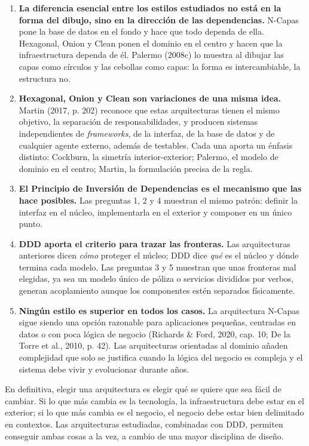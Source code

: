\documentclass[11pt,a4paper]{article}
\begin{document}
\begin{enumerate}[leftmargin=1.5em]
  \item \textbf{La diferencia esencial entre los estilos estudiados no está en la forma del dibujo, sino en la dirección de las dependencias.} N-Capas pone la base de datos en el fondo y hace que todo dependa de ella. Hexagonal, Onion y Clean ponen el dominio en el centro y hacen que la infraestructura dependa de él. Palermo (2008c) lo muestra al dibujar las capas como círculos y las cebollas como capas: la forma es intercambiable, la estructura no.
  \item \textbf{Hexagonal, Onion y Clean son variaciones de una misma idea.} Martin (2017, p. 202) reconoce que estas arquitecturas tienen el mismo objetivo, la separación de responsabilidades, y producen sistemas independientes de \emph{frameworks}, de la interfaz, de la base de datos y de cualquier agente externo, además de testables. Cada una aporta un énfasis distinto: Cockburn, la simetría interior-exterior; Palermo, el modelo de dominio en el centro; Martin, la formulación precisa de la regla.
  \item \textbf{El Principio de Inversión de Dependencias es el mecanismo que las hace posibles.} Las preguntas 1, 2 y 4 muestran el mismo patrón: definir la interfaz en el núcleo, implementarla en el exterior y componer en un único punto.
  \item \textbf{DDD aporta el criterio para trazar las fronteras.} Las arquitecturas anteriores dicen \emph{cómo} proteger el núcleo; DDD dice \emph{qué} es el núcleo y dónde termina cada modelo. Las preguntas 3 y 5 muestran que unas fronteras mal elegidas, ya sea un modelo único de póliza o servicios divididos por verbos, generan acoplamiento aunque los componentes estén separados físicamente.
  \item \textbf{Ningún estilo es superior en todos los casos.} La arquitectura N-Capas sigue siendo una opción razonable para aplicaciones pequeñas, centradas en datos o con poca lógica de negocio (Richards \& Ford, 2020, cap. 10; De la Torre et al., 2010, p. 42). Las arquitecturas orientadas al dominio añaden complejidad que solo se justifica cuando la lógica del negocio es compleja y el sistema debe vivir y evolucionar durante años.
\end{enumerate}

En definitiva, elegir una arquitectura es elegir qué se quiere que sea fácil de cambiar. Si lo que más cambia es la tecnología, la infraestructura debe estar en el exterior; si lo que más cambia es el negocio, el negocio debe estar bien delimitado en contextos. Las arquitecturas estudiadas, combinadas con DDD, permiten conseguir ambas cosas a la vez, a cambio de una mayor disciplina de diseño.
\end{document}
